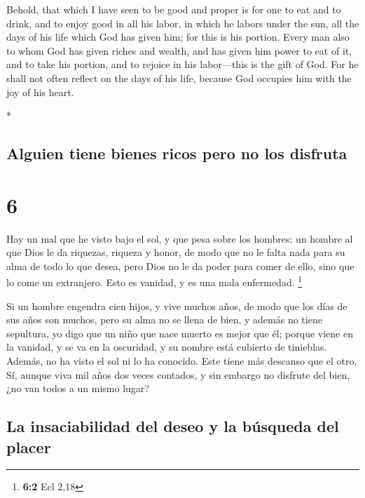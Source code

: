 \begin{paracol}{2}
\begin{otherlanguage}{english}
 Behold, that which I have seen to be good and proper is
for one to eat and to drink, and to enjoy good in all his labor, in
which he labors under the sun, all the days of his life which God has
given him; for this is his portion.  Every man also to
whom God has given riches and wealth, and has given him power to eat of
it, and to take his portion, and to rejoice in his labor---this is the
gift of God.  For he shall not often reflect on the days
of his life, because God occupies him with the joy of his heart.

\end{otherlanguage}

\switchcolumn[0]*

\hypertarget{alguien-tiene-bienes-ricos-pero-no-los-disfruta}{%
\subsection{Alguien tiene bienes ricos pero no los
disfruta}\label{alguien-tiene-bienes-ricos-pero-no-los-disfruta}}

\hypertarget{section-10}{%
\section{6}\label{section-10}}

 Hay un mal que he visto bajo el sol, y que pesa sobre los
hombres:  un hombre al que Dios le da riquezas, riqueza y
honor, de modo que no le falta nada para su alma de todo lo que desea,
pero Dios no le da poder para comer de ello, sino que lo come un
extranjero. Esto es vanidad, y es una mala enfermedad. \footnote{\textbf{6:2}
  Ecl 2,18}

 Si un hombre engendra cien hijos, y vive muchos años, de
modo que los días de sus años son muchos, pero su alma no se llena de
bien, y además no tiene sepultura, yo digo que un niño que nace muerto
es mejor que él;  porque viene en la vanidad, y se va en
la oscuridad, y su nombre está cubierto de tinieblas. 
Además, no ha visto el sol ni lo ha conocido. Este tiene más descanso
que el otro.  Sí, aunque viva mil años dos veces contados,
y sin embargo no disfrute del bien, ¿no van todos a un mismo lugar?

\hypertarget{la-insaciabilidad-del-deseo-y-la-buxfasqueda-del-placer}{%
\subsection{La insaciabilidad del deseo y la búsqueda del
placer}\label{la-insaciabilidad-del-deseo-y-la-buxfasqueda-del-placer}}


\end{paracol}
